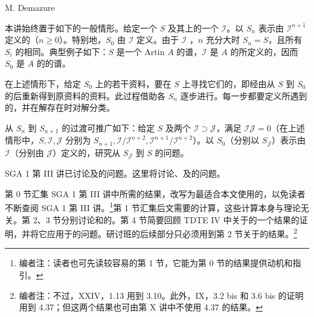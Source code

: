 \begin{center}M. Demazure\end{center}
本讲始终置于如下的一般情形。给定一个 $S$ 及其上的一个 $\mathcal I$。以 $S_n$ 表示由 $\mathcal I^{n+1}$ 定义的（$n\geq0$）。特别地，$S_0$ 由 $\mathcal I$ 定义。由于 $\mathcal I$ ，$n$ 充分大时 $S_n=S$，且所有 $S_i$ 的相同。典型例子如下：$S$ 是一个 Artin  $A$ 的谱，$\mathcal I$ 是 $A$ 的所定义的，因而 $S_0$ 是 $A$ 的的谱。

在上述情形下，给定 $S_0$ 上的若干资料，要在 $S$ 上寻找它们的，即经由从 $S$ 到 $S_0$ 的后重新得到原资料的资料。此过程借助各 $S_n$ 逐步进行。每一步都要定义所遇到的，并在解存在时对解分类。

从 $S_n$ 到 $S_{n+1}$ 的过渡可推广如下：给定 $S$ 及两个 $\mathcal I\supset\mathcal J$，满足 $\mathcal I\mathcal J=0$（在上述情形中，$S,\mathcal I,\mathcal J$ 分别为 $S_{n+1},\mathcal I/\mathcal I^{n+2},\mathcal I^{n+1}/\mathcal I^{n+2}$）。以 $S_0$（分别以 $S_{\mathcal J}$）表示由 $\mathcal I$（分别由 $\mathcal J$）定义的，研究从 $S_{\mathcal J}$ 到 $S$ 的问题。

SGA 1 第 III 讲已讨论及的问题。这里将讨论、及的问题。

第 0 节汇集 SGA 1 第 III 讲中所需的结果，改写为最适合本文使用的，以免读者不断查阅 SGA 1 第 III 讲。\footnote{编者注：读者也可先读较容易的第 1 节，它能为第 0 节的结果提供动机和指引。}第 1 节汇集后文需要的计算，这些计算本身与理论无关。第 2、3 节分别讨论和的。第 4 节简要回顾
TDTE IV 中关于的一个结果的证明，并将它应用于的问题。研讨班的后续部分只必须用到第 2 节关于的结果。\footnote{编者注：不过，XXIV，1.13 用到 3.10。此外，IX，3.2 bis 和 3.6 bis 的证明用到 4.37；但这两个结果也可由第 X 讲中不使用 4.37 的结果。}

